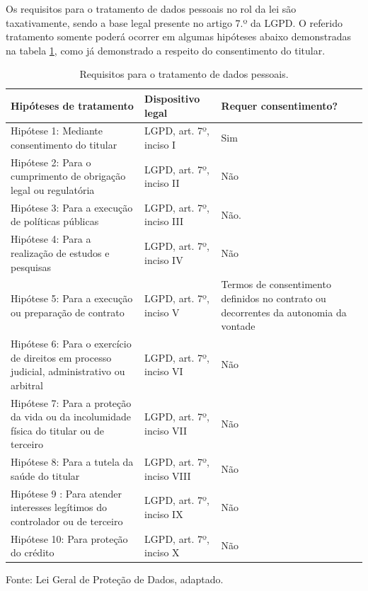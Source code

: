 \documentclass[
	12pt,				%
	openright,			%
	oneside,			%
	a4paper,			%
	english,			%
	french,				%
	spanish,			%
	brazil,				%
	]{abntex2}
\begin{document}
Os requisitos para o tratamento de dados pessoais no rol da lei são taxativamente, sendo a base legal presente no artigo 7.º da LGPD. O referido tratamento somente poderá ocorrer em algumas hipóteses abaixo demonstradas na tabela \ref{tab: requisitos de tratamento de dados}, como já demonstrado a respeito do consentimento do titular.

\begin{table}[ht]
    \centering
    \caption{Requisitos para o tratamento de dados pessoais.}
    \label{tab: requisitos de tratamento de dados}
    \begin{tabular}{|p{5 cm}|p{4.5cm}|p{5cm}|} 
        \hline
        \textbf{Hipóteses de tratamento} & \textbf{Dispositivo legal} & \textbf{Requer consentimento?} \\ \hline
        
         Hipótese 1: Mediante consentimento do titular & LGPD, art. 7º, inciso I & Sim \\ \hline
         
        Hipótese 2: Para o cumprimento de obrigação legal ou regulatória & LGPD, art. 7º, inciso II & Não  \\ \hline
        
        Hipótese 3: Para a execução de políticas públicas
 & LGPD, art. 7º, inciso III & Não. \\ \hline
 
        Hipótese 4: Para a realização de estudos e pesquisas & LGPD, art. 7º, inciso IV & Não  \\ \hline
        
        Hipótese 5: Para a execução ou preparação de contrato & LGPD, art. 7º, inciso V & Termos de consentimento definidos no contrato ou decorrentes da autonomia da vontade  \\ \hline
        
        Hipótese 6: Para o exercício de direitos em processo judicial, administrativo ou arbitral & LGPD, art. 7º, inciso VI & Não  \\ \hline
        
        Hipótese 7: Para a proteção da vida ou da incolumidade física do titular ou de terceiro & LGPD, art. 7º, inciso VII & Não  \\ \hline
        
        Hipótese 8: Para a tutela da saúde do titular & LGPD, art. 7º, inciso VIII & Não  \\ \hline
        
        Hipótese 9 : Para atender interesses legítimos do controlador ou de terceiro & LGPD, art. 7º, inciso IX & Não  \\ \hline
        
        Hipótese 10: Para proteção do crédito & LGPD, art. 7º, inciso X & Não  \\ \hline
    \end{tabular}
    \newline \newline Fonte: Lei Geral de Proteção de Dados, \cite{ 01-01-LeiGeral} adaptado.
\end{table}
\end{document}
